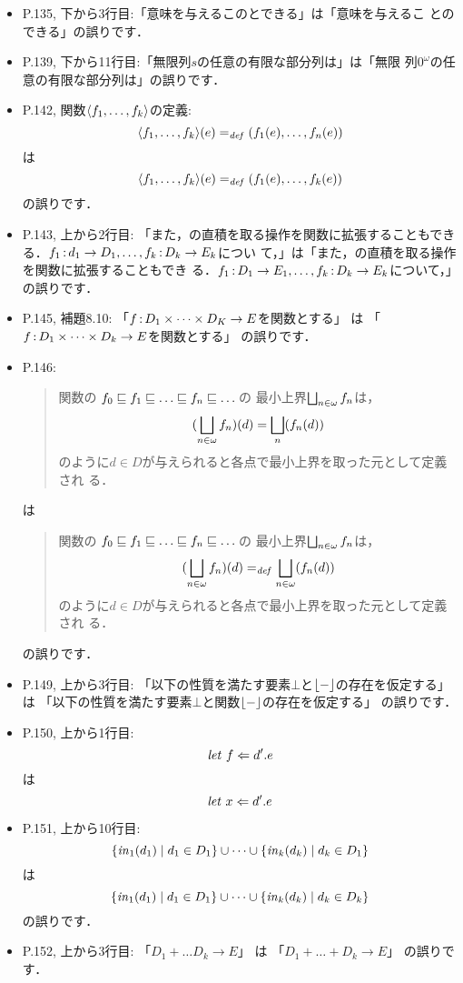 \documentclass[12pt,titlepage,twoside,openright,dvipdfmx]{jsbook}
\theoremstyle{definition}
\begin{document}
\begin{itemize}
\item P.135, 下から3行目:「意味を与えるこのとできる」は「意味を与えるこ
  とのできる」の誤りです．
\item P.139,
  下から11行目:「無限列$s$の任意の有限な部分列は」は「無限
  列$0^\omega$の任意の有限な部分列は」の誤りです．
\item P.142, 関数$\langle{f_1,\dots,f_k}\rangle$の定義:
  \[
    \langle{f_1,\dots,f_k}\rangle(e) =_{\mathit{def}} (f_1(e),\dots,f_n(e))
  \]
  は
  \[
    \langle{f_1,\dots,f_k}\rangle(e) =_{\mathit{def}} (f_1(e),\dots,f_k(e))
  \]
  の誤りです．
\item P.143, 上から2行目:
  「また，\cpo{}の直積を取る操作を関数に拡張することもできる．$f_1
  \operatorname{{:}} d_1 \rightarrow D_1,\dots,f_k \operatorname{{:}} D_k \rightarrow E_k$につい
  て，」は「また，\cpo{}の直積を取る操作を関数に拡張することもでき
  る．$f_1 \operatorname{{:}} D_1 \rightarrow E_1, \dots,f_k \operatorname{{:}} D_k \rightarrow
  E_k$について，」の誤りです．
\item P.145, 補題8.10:
  「$f \operatorname{{:}} D_1 \times \dots \times D_K \rightarrow E$を関数とする」
  は
  「$f \operatorname{{:}} D_1 \times \dots \times D_k \rightarrow E$を関数とする」
  の誤りです．
\item P.146:
  \begin{quote}
    関数の \omegachain $f_0 \sqle f_1 \sqle \dots \sqle f_n \sqle \dots$の
    最小上界$\bigsqcup_{n \in \omega} f_n$は，
    \[
      (\bigsqcup_{n \in \omega} f_n)(d) = \bigsqcup_n(f_n(d))
    \]
    のように$d \in D$が与えられると各点で最小上界を取った元として定義され
    る．
  \end{quote}
  は
  \begin{quote}
    関数の \omegachain $f_0 \sqle f_1 \sqle \dots \sqle f_n \sqle \dots$の
    最小上界$\bigsqcup_{n \in \omega} f_n$は，
    \[
      (\bigsqcup_{n \in \omega} f_n)(d) =_{\mathit{def}} \bigsqcup_{n \in \omega}(f_n(d))
    \]
    のように$d \in D$が与えられると各点で最小上界を取った元として定義され
    る．
  \end{quote}
  の誤りです．
\item P.149, 上から3行目:
  「以下の性質を満たす要素$\bot$と$\lfloor - \rfloor$の存在を仮定する」
  は
  「以下の性質を満たす要素$\bot$と関数$\lfloor - \rfloor$の存在を仮定する」
  の誤りです．
\item P.150, 上から1行目:
  \[
    \mathit{let}\ f \Leftarrow d'. e
  \]
  は
  \[
    \mathit{let}\ x \Leftarrow d'. e
  \]
\item P.151, 上から10行目:
  \[
    \left\{{\mathit{in}_1(d_1) \mid d_1 \in D_1}\right\} \cup \dots \cup \left\{{\mathit{in}_k(d_k) \mid d_k \in D_1}\right\}
  \]
  は
  \[
    \left\{{\mathit{in}_1(d_1) \mid d_1 \in D_1}\right\} \cup \dots \cup \left\{{\mathit{in}_k(d_k) \mid d_k \in D_k}\right\}
  \]
  の誤りです．
\item P.152, 上から3行目:
  「$D_1 + \dots D_k \rightarrow E$」
  は
  「$D_1 + \dots + D_k \rightarrow E$」
  の誤りです．
\end{itemize}
\end{document}

